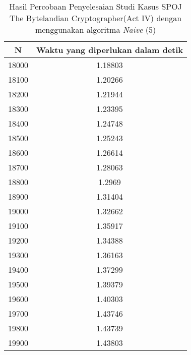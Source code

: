 \begin{table}[H]
\centering
\begin{tabular}{|c|c|}\hline
N&Waktu yang diperlukan dalam detik\\ \hline
18000&1.18803\\ \hline
18100&1.20266\\ \hline
18200&1.21944\\ \hline
18300&1.23395\\ \hline
18400&1.24748\\ \hline
18500&1.25243\\ \hline
18600&1.26614\\ \hline
18700&1.28063\\ \hline
18800&1.2969\\ \hline
18900&1.31404\\ \hline
19000&1.32662\\ \hline
19100&1.35917\\ \hline
19200&1.34388\\ \hline
19300&1.36163\\ \hline
19400&1.37299\\ \hline
19500&1.39379\\ \hline
19600&1.40303\\ \hline
19700&1.43746\\ \hline
19800&1.43739\\ \hline
19900&1.43803\\ \hline
\end{tabular}
\caption {Hasil Percobaan Penyelesaian Studi Kasus SPOJ The Bytelandian Cryptographer(Act IV) dengan menggunakan algoritma \textit{Naive} (5)}
\label{tab1:1res10}
\end{table}